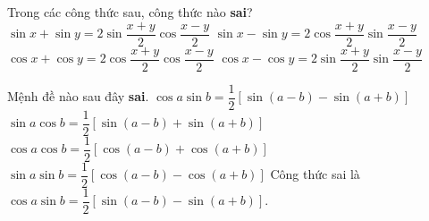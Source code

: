 \begin{ex}%
Trong các công thức sau, công thức nào \textbf{sai}?
\choice
{$\sin x+\sin y=2\sin \dfrac{x+y}{2}\cos \dfrac{x-y}{2}$}
{$\sin x-\sin y=2\cos \dfrac{x+y}{2}\sin \dfrac{x-y}{2}$}
{$\cos x+\cos y=2\cos \dfrac{x+y}{2}\cos \dfrac{x-y}{2}$}
{\True $\cos x-\cos y=2\sin \dfrac{x+y}{2}\sin \dfrac{x-y}{2}$}
\end{ex}

\begin{ex}%
Mệnh đề nào sau đây \textbf{sai}.
\choice
{\True $\cos a \sin b=\dfrac{1}{2}[\sin (a-b)-\sin (a+b)]$}
{$\sin a \cos b=\dfrac{1}{2}[\sin (a-b)+\sin (a+b)]$}
{$\cos a \cos b=\dfrac{1}{2}[\cos (a-b)+\cos (a+b)]$}
{$\sin a \sin b=\dfrac{1}{2}[\cos (a-b)-\cos (a+b)]$}
\loigiai
{Công thức sai là $\cos a \sin b=\dfrac{1}{2}[\sin (a-b)-\sin (a+b)]$.}
\end{ex}



